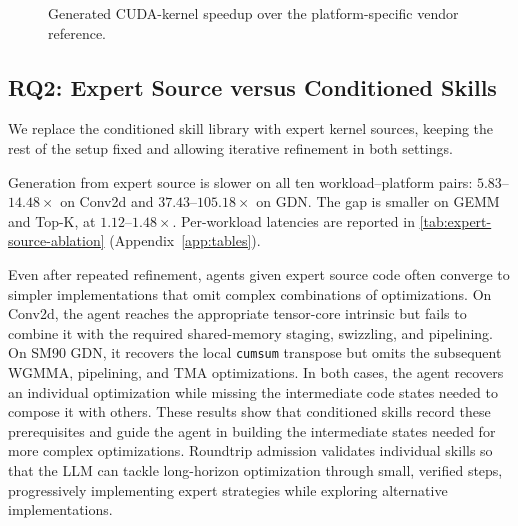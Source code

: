\begin{figure}[t]
\caption{Generated CUDA-kernel speedup over the platform-specific vendor reference. }
\label{fig:cuda-bars}
\end{figure}

\subsection{RQ2: Expert Source versus Conditioned Skills}
\label{sec:exp-source-ablation}

We replace the conditioned skill library with expert kernel sources, keeping the rest of the setup fixed and allowing iterative refinement in both settings.

Generation from expert source is slower on all ten workload--platform pairs: $5.83$--$14.48\times$ on Conv2d and $37.43$--$105.18\times$ on GDN. The gap is smaller on GEMM and Top-K, at $1.12$--$1.48\times$. Per-workload latencies are reported in \autoref{tab:expert-source-ablation} (Appendix~\ref{app:tables}).

Even after repeated refinement, agents given expert source code often converge to simpler implementations that omit complex combinations of optimizations. On Conv2d, the agent reaches the appropriate tensor-core intrinsic but fails to combine it with the required shared-memory staging, swizzling, and pipelining. On SM90 GDN, it recovers the local \texttt{cumsum} transpose but omits the subsequent WGMMA, pipelining, and TMA optimizations. In both cases, the agent recovers an individual optimization while missing the intermediate code states needed to compose it with others. These results show that conditioned skills record these prerequisites and guide the agent in building the intermediate states needed for more complex optimizations. Roundtrip admission validates individual skills so that the LLM can tackle long-horizon optimization through small, verified steps, progressively implementing expert strategies while exploring alternative implementations.

